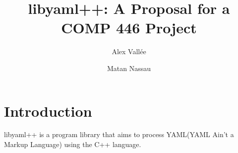 \documentclass{article}
\author{Alex Vall\'ee \and Matan Nassau}
\title{libyaml++:  A Proposal for a COMP 446 Project}
\begin{document}
\maketitle
\section{Introduction}
libyaml++ is a program library that aims to process YAML(YAML Ain't a Markup
Language) using the C++ language.
\end{document}
